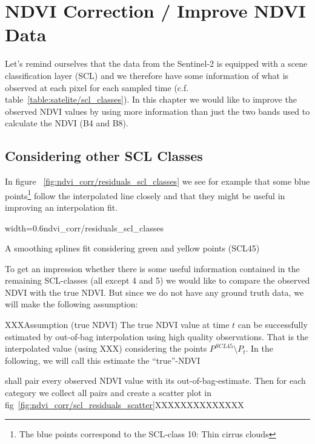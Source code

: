 \chapter{NDVI Correction / Improve NDVI Data}

Let's remind ourselves that the data from the Sentinel-2 is equipped with a scene classification layer (SCL) and we therefore have some information of what is observed at each pixel for each sampled time (c.f. table~\ref{table:satelite/scl_classes}). In this chapter we would like to improve the observed NDVI values by using more information than just the two bands used to calculate the NDVI (B4 and B8).

\section{Considering other SCL Classes}
In figure ~\ref{fig:ndvi_corr/residuals_scl_classes} we see for example that some blue points\footnote{The blue points correspond to the SCL-class 10: Thin cirrus clouds} follow the interpolated line closely and that they might be useful in improving an interpolation fit.

\begin{my_figure}[ht]{width=0.6\textwidth}{ndvi_corr/residuals_scl_classes}
    \caption{A smoothing splines fit considering green and yellow points (SCL45)}
    \label{fig:ndvi_corr/residuals_scl_classes}
\end{my_figure}

To get an impression whether there is some useful information contained in the remaining SCL-classes (all except 4 and 5) we would like to compare the observed NDVI with the true NDVI. But since we do not have any ground truth data, we will make the following assumption:


\begin{definition}{XXXAssumption (true NDVI)}
    The true NDVI value at time $t$ can be successfully estimated by out-of-bag interpolation using high quality observations. That is the interpolated value (using XXX) considering the points $P^{SCL45}\setminus P_t$. In the following, we will call this estimate the ``true''-NDVI
\end{definition}

shall pair every observed NDVI value with its out-of-bag-estimate. Then for each category we collect all pairs and create a scatter plot in fig~\ref{fig:ndvi_corr/scl_residuals_scatter}XXXXXXXXXXXXXX



